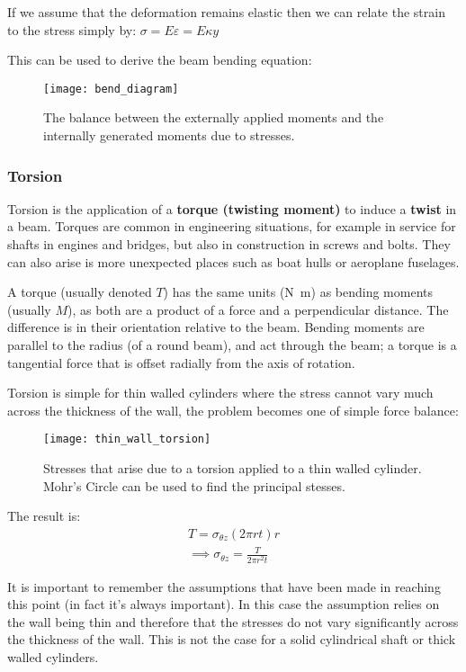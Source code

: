 If we assume that the deformation remains elastic then we can relate the strain to the stress simply by: $\sigma = E \varepsilon = E\kappa y$

This can be used to derive the beam bending equation:

\FloatBarrier
\begin{figure}[h!]
\centering
\texttt{[image: bend\_diagram]}
\caption{The balance between the externally applied moments and the internally generated moments due to stresses.\label{}}
\end{figure}
\FloatBarrier

\subsubsection{Torsion}

Torsion is the application of a {\bf torque (twisting moment)} to induce a {\bf twist} in a beam. Torques are common in engineering situations, for example in service for shafts in engines and bridges, but also in construction in screws and bolts. They can also arise is more unexpected places such as boat hulls or aeroplane fuselages. 

A torque (usually denoted $T$) has the same units (\si{\newton\meter}) as bending moments (usually $M$), as both are a product of a force and a perpendicular distance. The difference is in their orientation relative to the beam. Bending moments are parallel to the radius (of a round beam), and act through the beam; a torque is a tangential force that is offset radially from the axis of rotation.

Torsion is simple for thin walled cylinders where the stress cannot vary much across the thickness of the wall, the problem becomes one of simple force balance:


\FloatBarrier
\begin{figure}[h!]
\centering
\texttt{[image: thin\_wall\_torsion]}
\caption{Stresses that arise due to a torsion applied to a thin walled cylinder. Mohr's Circle can be used to find the principal stesses.}
\end{figure}
\FloatBarrier
The result is:
\begin{align}
T= \sigma_{\theta z} (2\pi r t) r \nonumber \\
\implies \sigma_{\theta z} = \frac{T}{2 \pi r^2 t}
\end{align}


It is important to remember the assumptions that have been made in reaching this point (in fact it's always important). In this case the assumption relies on the wall being thin and therefore that the stresses do not vary significantly across the thickness of the wall. This is not the case for a solid cylindrical shaft or thick walled cylinders.

